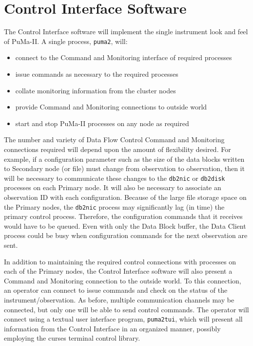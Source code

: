 \chapter{Control Interface Software}

The Control Interface software will implement the single instrument
look and feel of PuMa-II.  A single process, {\tt puma2}, will:

\begin{itemize}
\item connect to the Command and Monitoring interface of required processes
\item issue commands as necessary to the required processes
\item collate monitoring information from the cluster nodes
\item provide Command and Monitoring connections to outside world
\item start and stop PuMa-II processes on any node as required
\end{itemize}

The number and variety of Data Flow Control Command and Monitoring
connections required will depend upon the amount of flexibility
desired. For example, if a configuration parameter such as the size of
the data blocks written to Secondary node (or file) must change from
observation to observation, then it will be necessary to communicate
these changes to the {\tt db2nic} or {\tt db2disk} processes on each
Primary node.  It will also be necessary to associate an observation
ID with each configuration.  Because of the large file storage space
on the Primary nodes, the {\tt db2nic} process may significantly lag
(in time) the primary control process.  Therefore, the configuration
commands that it receives would have to be queued.  Even with only the
Data Block buffer, the Data Client process could be busy when
configuration commands for the next observation are sent.

In addition to maintaining the required control connections with
processes on each of the Primary nodes, the Control Interface software
will also present a Command and Monitoring connection to the outside
world.  To this connection, an operator can connect to issue commands
and check on the status of the instrument/observation.  As before,
multiple communication channels may be connected, but only one will be
able to send control commands.  The operator will connect using a
textual user interface program, {\tt puma2tui}, which will present all
information from the Control Interface in an organized manner,
possibly employing the curses terminal control library.

